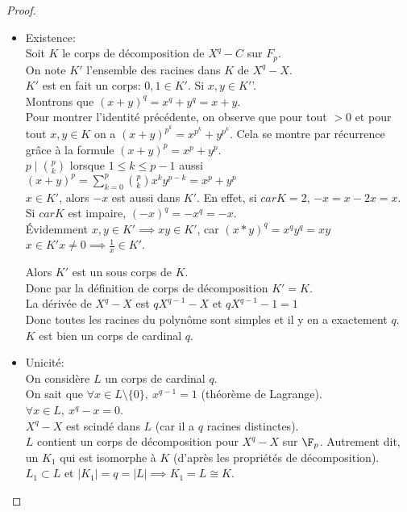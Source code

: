 \begin{proof}
	\begin{itemize}
		\item Existence:\\

		      Soit $K$ le corps de décomposition de $X^q-C$ sur $F_p$. \\
		      On note $K'$ l'ensemble des racines dans $K$ de $X^q-X$. \\
		      $K'$ est en fait un corps: $0, 1 \in K'$. Si $x, y \in K'$'.\\
		      Montrons que $(x+y)^q = x^q + y^q = x+ y$.\\
		      Pour montrer l'identité précédente, on observe que pour tout $>0$ et pour tout $x,y \in K$ on a
		      $(x+y)^{p^k}= x^{p^k} + y^{p^k}$. Cela se montre par récurrence grâce à la formule $(x+y)^p= x^p + y^p$.\\
		      $p \mid \binom{p}{k}$ lorsque $1 \leq k \leq p-1$ aussi $(x+y)^p = \sum^p_{k=0} \binom{p}{k} x^k y^{p-k} = x^p + y^p$\\

		      $x\in K'$, alors $-x$ est aussi dans $K'$.
		      En effet, si $car K = 2$, $-x = x -2x = x$. \\
		      Si $car K$ est impaire, $(-x)^q = -x^q = -x$. \\
		      Évidemment $x,y \in K' \implies xy \in K'$, car $(x*y)^q = x^qy^q = xy$\\
		      $x\in K' x \neq 0 \implies \frac{1}{x} \in K'$.

		      Alors $K'$ est un sous corps de $K$.\\
		      Donc par la définition de corps de décomposition $K' = K$.\\

		      La dérivée de $X^q-X$ est $qX^{q-1} - X$ et $qX^{q-1} - 1 = 1$\\
		      Donc toutes les racines du polynôme sont simples et il y en a exactement $q$. $K$ est bien un corps de cardinal $q$.\\

		\item Unicité:\\

		      On considère $L$ un corps de cardinal $q$.\\
		      On sait que $\forall x \in L \setminus \{0\},\  x^{q-1} = 1$ (théorème de Lagrange).\\ %
		      $\forall x \in L, \ x^q -x = 0$.\\
		      $X^q-X$ est scindé dans $L$ (car il a $q$ racines distinctes).\\ %
		      $L$ contient un corps de décomposition pour $X^q-X$ sur $\F_p$. Autrement dit, un $K_1$ qui est
		      isomorphe à $K$ (d'après les propriétés de décomposition).\\
		      $L_1 \subset L$ et $|K_1| = q = |L| \implies K_1 = L \cong K$.
	\end{itemize}
\end{proof}

